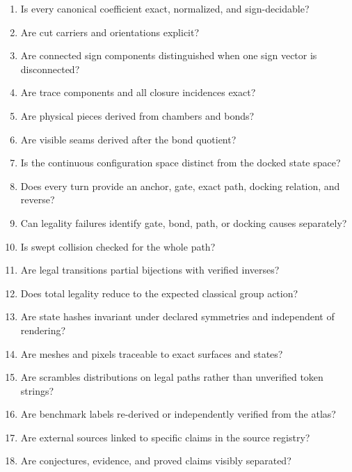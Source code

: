 \documentclass[11pt,openany]{book}
\theoremstyle{polyplain}
\theoremstyle{polydef}
\begin{document}
\begin{enumerate}
  \item Is every canonical coefficient exact, normalized, and sign-decidable?
  \item Are cut carriers and orientations explicit?
  \item Are connected sign components distinguished when one sign vector is disconnected?
  \item Are trace components and all closure incidences exact?
  \item Are physical pieces derived from chambers and bonds?
  \item Are visible seams derived after the bond quotient?
  \item Is the continuous configuration space distinct from the docked state space?
  \item Does every turn provide an anchor, gate, exact path, docking relation, and reverse?
  \item Can legality failures identify gate, bond, path, or docking causes separately?
  \item Is swept collision checked for the whole path?
  \item Are legal transitions partial bijections with verified inverses?
  \item Does total legality reduce to the expected classical group action?
  \item Are state hashes invariant under declared symmetries and independent of rendering?
  \item Are meshes and pixels traceable to exact surfaces and states?
  \item Are scrambles distributions on legal paths rather than unverified token strings?
  \item Are benchmark labels re-derived or independently verified from the atlas?
  \item Are external sources linked to specific claims in the source registry?
  \item Are conjectures, evidence, and proved claims visibly separated?
\end{enumerate}

\backmatter
\printbibliography[heading=bibintoc,title={References}]
\end{document}
